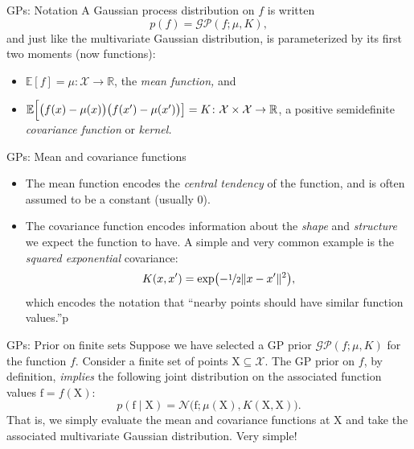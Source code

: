 \documentclass[xcolor={dvipsnames},hyperref={breaklinks=true},12pt]{beamer}
\newcommand{\given}{\mid}
\newcommand{\mc}[1]{\mathcal{#1}}
\newcommand{\mat}[1]{\bm{\mathrm{#1}}}
\renewcommand{\vec}[1]{\bm{\mathrm{#1}}}
\newcommand{\R}{\mathbb{R}}
\newcommand{\Exp}{\mathbb{E}}
\newcommand{\emphr}[1]{{\textcolor{or}{\itshape #1}}}
\begin{document}
\begin{frame}{GPs: Notation}
  A Gaussian process distribution on $f$ is written
  \begin{equation*}
    p(f) = \mc{GP}(f; \mu, K),
  \end{equation*}
  and just like the multivariate Gaussian distribution, is
  parameterized by its first two moments (now functions):
  \begin{itemize}
  \item $\Exp[f] = \mu\colon \mc{X} \to \R$, the \emphr{mean function,} and
  \item $\Exp\Bigl[\bigl(f(x) - \mu(x)\bigr)\bigl(f(x') - \mu(x')\bigr)\bigr]
    = K\colon \mc{X} \times \mc{X} \to \R$,
    a positive semidefinite \emphr{covariance function} or \emphr{kernel.}
  \end{itemize}
\end{frame}

\begin{frame}{GPs: Mean and covariance functions}
  \begin{itemize}
    \item The mean function encodes the \emphr{central tendency} of
      the function, and is often assumed to be a constant (usually 0).
    \item The covariance function encodes information about the
      \emphr{shape} and \emphr{structure} we expect the function to
      have.  A simple and very common example is the \emphr{squared
        exponential} covariance:
      \begin{equation*}
        K(x, x') = \exp\bigl(-\nicefrac{1}{2}\lVert x - x' \rVert^2\bigr),
      \end{equation*}
      which encodes the notation that ``nearby points should have
      similar function values.''p
  \end{itemize}
\end{frame}

\begin{frame}{GPs: Prior on finite sets}
  Suppose we have selected a GP prior $\mc{GP}(f; \mu, K)$ for the
  function $f$.  Consider a finite set of points $\mat{X} \subseteq
  \mc{X}$.  The GP prior on $f$, by definition, \emphr{implies} the
  following joint distribution on the associated function values
  $\vec{f} = f(\mat{X})$:
  \begin{equation*}
    p(\vec{f} \given \mat{X})
    =
    \mc{N}(\vec{f}; \mu(\mat{X}), K(\mat{X}, \mat{X})\bigr).
  \end{equation*}
  That is, we simply evaluate the mean and covariance functions at $\mat{X}$
  and take the associated multivariate Gaussian distribution.  Very simple!
\end{frame}
\end{document}
